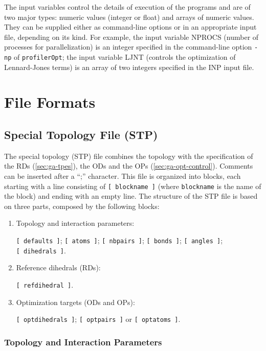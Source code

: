 \documentclass[10pt,a4paper,openany]{memoir}
\numberwithin{equation}{section}
\newcommand{\profileropt}[0]{\texttt{profilerOpt}}
\begin{document}
The input variables control the details of execution of the programs
and are of two major types: numeric values (integer or float) and
arrays of numeric values. They can be supplied either as command-line
options or in an appropriate input file, depending on its kind.  For
example, the input variable NPROCS (number of processes for
parallelization) is an integer specified in the command-line option
\texttt{-np} of \profileropt{}; the input variable LJNT (controls the
optimization of Lennard-Jones terms) is an array of two integers
specified in the INP input file.

\section{File Formats}
\label{sec:file-formats-file-formats}

\subsection{Special Topology File (STP)}
\label{sec:file-formats-STP}

The special topology (STP) file combines the topology with the
specification of the RDs (\autoref{sec:ga-tpes}), the ODs and the OPs
(\autoref{sec:ga-opt-control}). Comments can be inserted after a ``;''
character.  This file is organized into blocks, each starting with a
line consisting of \texttt{[~blockname~]} (where \texttt{blockname} is
the name of the block) and ending with an empty line.  The structure
of the STP file is based on three parts, composed by the following
blocks:
\begin{enumerate}
\item Topology and interaction parameters:\par \texttt{[~defaults~]}; \texttt{[~atoms~]}; \texttt{[~nbpairs~]}; \texttt{[~bonds~]}; \texttt{[~angles~]}; \texttt{[~dihedrals~]}.
\item Reference dihedrals (RDs):\par\texttt{[~refdihedral~]}.
\item Optimization targets (ODs and OPs):\par\texttt{[~optdihedrals~]}; \texttt{[~optpairs~]} or \texttt{[~optatoms~]}.
\end{enumerate}

\subsubsection{Topology and Interaction Parameters}
\label{sec:stp-topology}
\end{document}
